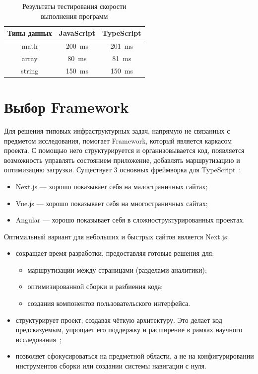 \begin{table}[H]
\caption{\label{tab:testJSandTS}Результаты тестирования скорости выполнения программ}
\begin{center}
\vspace{-0.5cm}\begin{tabular}{|c|c|c|}
\hline
Типы данных & JavaScript & TypeScript \\ \hline
math & 200~ms & 201~ms \\ \hline
array & 80~ms & 81~ms \\ \hline
string & 150~ms & 150~ms \\ \hline
\end{tabular}
\end{center}
\end{table}

\section{Выбор Framework}

Для решения типовых инфраструктурных задач, напрямую не связанных с предметом исследования, помогает Framework, который является каркасом проекта. С помощью него структурируется и организовывается код, появляется возможность управлять состоянием приложение, добавлять маршрутизацию и оптимизацию загрузки. Существует 3 основных фреймворка для TypeScript~\cite{whatIsFramework}:

\begin{itemize}
 \item Next.js — хорошо показывает себя на малостраничных сайтах;
 \item Vue.js — хорошо показывает себя на многостраничных сайтах;
 \item Angular — хорошо показывает себя в сложноструктурированных проектах.
\end{itemize}

Оптимальный вариант для небольших и быстрых сайтов является Next.js:

\begin{itemize}
\item сокращает время разработки, предоставляя готовые решения для:
\begin{itemize}
\item маршрутизации между страницами (разделами аналитики);
\item оптимизированной сборки и разбиения кода;
\item создания компонентов пользовательского интерфейса.
\end{itemize}
\item структурирует проект, создавая чёткую архитектуру. Это делает код предсказуемым, упрощает его поддержку и расширение в рамках научного исследования~\cite{nextjsHandbook};
\item позволяет сфокусироваться на предметной области, а не на конфигурировании инструментов сборки или создании системы навигации с нуля.
\end{itemize}

